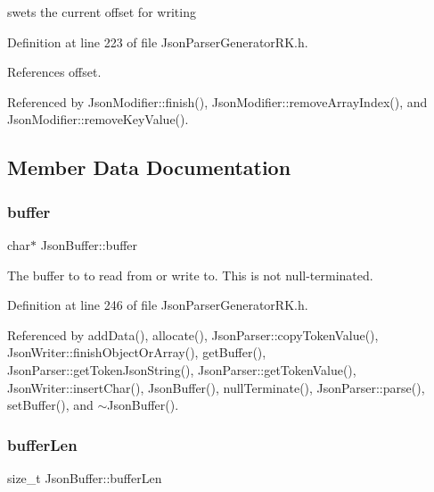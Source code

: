 swets the current offset for writing 



Definition at line 223 of file Json\+Parser\+Generator\+R\+K.\+h.



References offset.



Referenced by Json\+Modifier\+::finish(), Json\+Modifier\+::remove\+Array\+Index(), and Json\+Modifier\+::remove\+Key\+Value().



\subsection{Member Data Documentation}
\mbox{\label{class_json_buffer_aaee27fe51d12d68bd6031df3bc78b6b5}} 
\subsubsection{\texorpdfstring{buffer}{buffer}}
{\footnotesize\ttfamily char$\ast$ Json\+Buffer\+::buffer\hspace{0.3cm}{\ttfamily [protected]}}



The buffer to to read from or write to. This is not null-\/terminated. 



Definition at line 246 of file Json\+Parser\+Generator\+R\+K.\+h.



Referenced by add\+Data(), allocate(), Json\+Parser\+::copy\+Token\+Value(), Json\+Writer\+::finish\+Object\+Or\+Array(), get\+Buffer(), Json\+Parser\+::get\+Token\+Json\+String(), Json\+Parser\+::get\+Token\+Value(), Json\+Writer\+::insert\+Char(), Json\+Buffer(), null\+Terminate(), Json\+Parser\+::parse(), set\+Buffer(), and $\sim$\+Json\+Buffer().

\mbox{\label{class_json_buffer_af06130f43f71623ea6afe049c846e52b}} 
\subsubsection{\texorpdfstring{buffer\+Len}{bufferLen}}
{\footnotesize\ttfamily size\+\_\+t Json\+Buffer\+::buffer\+Len\hspace{0.3cm}{\ttfamily [protected]}}



